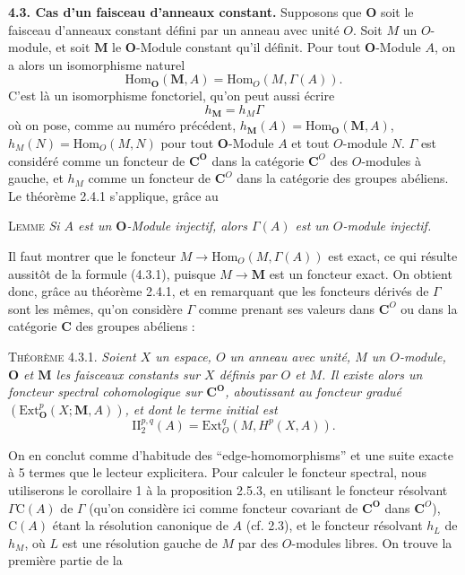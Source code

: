 \clearpage
{}

\textbf{4.3. Cas d'un faisceau d'anneaux constant.}
Supposons que $\mathbf O$ soit le faisceau d'anneaux constant défini par un
anneau avec unité $O$. Soit $M$ un $O$-module, et soit $\mathbf M$ le
$\mathbf O$-Module constant qu'il définit. Pour tout $\mathbf O$-Module $A$,
on a alors un isomorphisme naturel
\[
\tag{4.3.1}
\mathrm{Hom}_{\mathbf O}(\mathbf M,A)=\mathrm{Hom}_O(M,\Gamma(A)).
\]
C'est là un isomorphisme fonctoriel, qu'on peut aussi écrire
\[
\tag{4.3.2}
h_{\mathbf M}=h_M\Gamma
\]
où on pose, comme au numéro précédent,
$h_{\mathbf M}(A)=\mathrm{Hom}_{\mathbf O}(\mathbf M,A)$,
$h_M(N)=\mathrm{Hom}_O(M,N)$ pour tout $\mathbf O$-Module $A$ et tout
$O$-module $N$. $\Gamma$ est considéré comme un foncteur de
$\mathbf C^{\mathbf O}$ dans la catégorie $\mathbf C^O$ des $O$-modules à gauche, et
$h_M$ comme un foncteur de $\mathbf C^O$ dans la catégorie des
groupes abéliens. Le théorème 2.4.1 s'applique, grâce au

\textsc{Lemme} \textit{Si $A$ est un $\mathbf O$-Module injectif,
alors $\Gamma(A)$ est un $O$-module injectif.}

Il faut montrer que le foncteur
$M\to\mathrm{Hom}_O(M,\Gamma(A))$ est exact, ce qui résulte aussitôt
de la formule (4.3.1), puisque $M\to\mathbf M$ est un foncteur exact.
On obtient donc, grâce au théorème 2.4.1, et en remarquant que les foncteurs
dérivés de $\Gamma$ sont les mêmes, qu'on considère $\Gamma$ comme prenant
ses valeurs dans $\mathbf C^O$ ou dans la catégorie $\mathbf C$ des groupes abéliens :

\textsc{Théorème 4.3.1.} \textit{Soient $X$ un espace, $O$ un anneau
avec unité, $M$ un $O$-module, $\mathbf O$ et $\mathbf M$ les faisceaux
constants sur $X$ définis par $O$ et $M$. Il existe alors un foncteur spectral
cohomologique sur $\mathbf C^{\mathbf O}$, aboutissant au foncteur gradué
$(\mathrm{Ext}_{\mathbf O}^p(X;\mathbf M,A))$, et dont le terme initial est}
\[
\tag{4.3.3}
\mathrm{II}_2^{p,q}(A)=\mathrm{Ext}_O^q(M,H^p(X,A)).
\]

On en conclut comme d'habitude des ``edge-homomorphisms'' et une suite exacte
à 5 termes que le lecteur explicitera.
Pour calculer le foncteur spectral, nous utiliserons le corollaire 1 à la
proposition 2.5.3, en utilisant le foncteur résolvant $\Gamma \mathrm C(A)$ de
$\Gamma$ (qu'on considère ici comme foncteur covariant de $\mathbf C^{\mathbf O}$
dans $\mathbf C^O$), $\mathrm C(A)$ étant la résolution canonique de $A$ (cf. 2.3), et le
foncteur résolvant $h_L$ de $h_M$, où $L$ est une résolution gauche de $M$ par
des $O$-modules libres. On trouve la première partie de la

